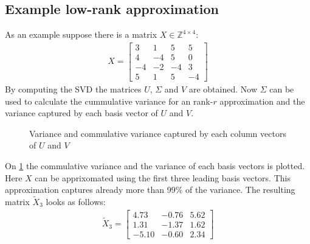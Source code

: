 \subsection{Example low-rank approximation}
As an example suppose there is a matrix \(X \in \mathbb{Z}^{4\times4}\):
\begin{gather}
X = \begin{bmatrix}
3 & 1 & 5 & 5 \\
4 & -4 & 5 & 0 \\
-4 & -2 & -4 & 3 \\
5 & 1 & 5 & -4
\end{bmatrix}
\end{gather}
By computing the SVD the matrices \(U\), \(\Sigma\) and \(V\) are obtained.
Now \(\Sigma\) can be used to calculate the cummulative variance for an rank-\(r\) approximation and the variance captured by each basis vector of \(U\) and \(V\).
\pgfplotsset{width=6cm,compat=1.9}
\begin{figure}[H]
\centering
{}
\label{var-plt}
\caption{Variance and commulative variance captured by each column vectors of \(U\) and \(V\)}
\end{figure}
On \ref{var-plt} the commulative variance and the variance of each basis vectors is plotted.
Here \(X\) can be apprixomated using the first three leading basis vectors.
This approximation captures already more than 99\% of the variance.
The resulting matrix \(\tilde{X}_3\) looks as follows:
\begin{gather}
\tilde{X}_3 = \begin{bmatrix}
4.73 & -0.76 & 5.62 \\
1.31 & -1.37 & 1.62 \\
-5.10 & -0.60 & 2.34
\end{bmatrix}
\end{gather}



